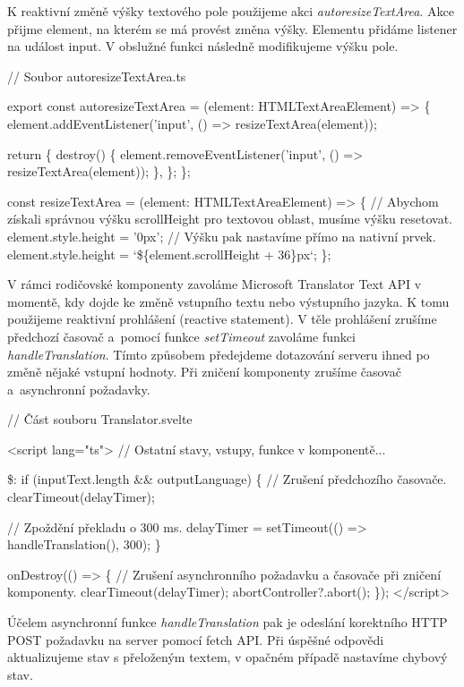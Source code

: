 K reaktivní změně výšky textového pole použijeme akci \emph{autoresizeTextArea}. Akce přijme element, na kterém se má provést změna výšky. Elementu přidáme listener na událost input. 
V obslužné funkci následně modifikujeme výšku pole.

\begin{prog}
// Soubor autoresizeTextArea.ts

export const autoresizeTextArea = (element: HTMLTextAreaElement) => \{
  element.addEventListener('input', () => resizeTextArea(element));

  return \{
    destroy() \{
      element.removeEventListener('input', () => resizeTextArea(element));
    \},
  \};
\};

const resizeTextArea = (element: HTMLTextAreaElement) => \{
  // Abychom získali správnou výšku scrollHeight 
    pro textovou oblast, musíme výšku resetovat.
  element.style.height = '0px';
  // Výšku pak nastavíme přímo na nativní prvek.
  element.style.height = `\$\{element.scrollHeight + 36\}px`;
\};
\end{prog}

V rámci rodičovské komponenty zavoláme Microsoft Translator Text API \cite{translatortextapi} v momentě, kdy dojde ke změně vstupního textu nebo výstupního jazyka. 
K tomu použijeme reaktivní prohlášení (reactive statement). V těle prohlášení zrušíme předchozí časovač a~pomocí funkce \emph{setTimeout} zavoláme funkci \emph{handleTranslation}. 
Tímto způsobem předejdeme dotazování serveru ihned po změně nějaké vstupní hodnoty. Při zničení komponenty zrušíme časovač a~asynchronní požadavky.

\begin{prog}
// Část souboru Translator.svelte

<script lang="ts">
  // Ostatní stavy, vstupy, funkce v komponentě...
  
  \$: if (inputText.length && outputLanguage) \{
    // Zrušení předchozího časovače.
    clearTimeout(delayTimer);

    // Zpoždění překladu o 300 ms.
    delayTimer = setTimeout(() => handleTranslation(), 300);
  \}

  onDestroy(() => \{
    // Zrušení asynchronního požadavku a časovače při zničení komponenty.
    clearTimeout(delayTimer);
    abortController?.abort();
  \});
</script>
\end{prog}

Účelem asynchronní funkce \emph{handleTranslation} pak je odeslání korektního HTTP POST požadavku na server pomocí fetch API. 
Při úspěšné odpovědi aktualizujeme stav s přeloženým textem, v opačném případě nastavíme chybový stav.

